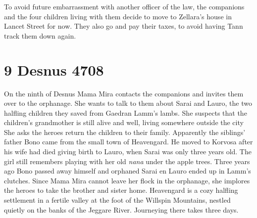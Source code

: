 To avoid future embarrassment with another officer of the law, the companions and the four children living with them decide to move to Zellara's house in Lancet Street for now. They also go and pay their taxes, to avoid having Tann track them down again.\\

\section{9 Desnus 4708}

On the ninth of Desnus Mama Mira contacts the companions and invites them over to the orphanage. She wants to talk to them about Sarai and Lauro, the two halfling children they saved from Gaedran Lamm's lambs. She suspects that the children's grandmother is still alive and well, living somewhere outside the city She asks the heroes return the children to their family. Apparently the siblings' father Bono came from the small town of Heavengard. He moved to Korvosa after his wife had died giving birth to Lauro, when Sarai was only three years old. The girl still remembers playing with her old {\itshape nana} under the apple trees. Three years ago Bono passed away himself and orphaned Sarai en Lauro ended up in Lamm's clutches. Since Mama Mira cannot leave her flock in the orphanage, she implores the heroes to take the brother and sister home. Heavengard is a cozy halfling settlement in a fertile valley at the foot of the Willspin Mountains, nestled quietly on the banks of the Jeggare River. Journeying there takes three days.\\


